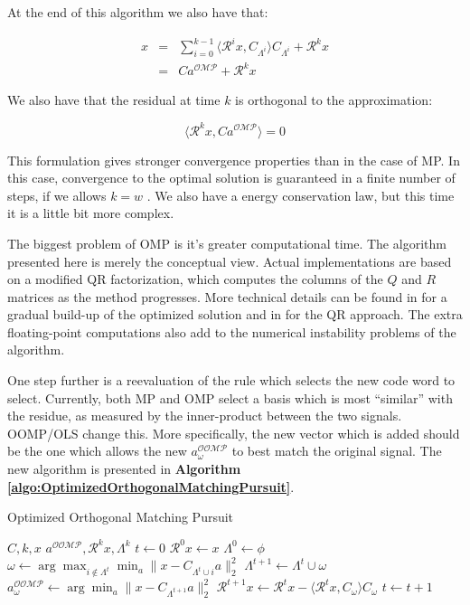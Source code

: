 \documentclass[runningheads,a4paper]{llncs}
\begin{document}
At the end of this algorithm we also have that:

\begin{eqnarray}
x & = & \sum_{i=0}^{k-1} \langle \mathcal{R}^ix , C_{\Lambda^i} \rangle C_{\Lambda^i} + \mathcal{R}^kx \\
\label{eqn:OrthogonalMatchingPursuitResult}
  & = & Ca^\mathcal{OMP} + \mathcal{R}^kx
\end{eqnarray}

We also have that the residual at time $k$ is orthogonal to the approximation:

\begin{equation*}
\langle \mathcal{R}^kx , Ca^\mathcal{OMP} \rangle = 0
\end{equation*}

This formulation gives stronger convergence properties than in the case of MP. In this case, convergence to the optimal solution is guaranteed in a finite number of steps, if we allows $k = w$ \cite{matchingpursuit2,pursuitdifferences}. We also have a energy conservation law, but this time it is a little bit more complex.

The biggest problem of OMP is it's greater computational time. The algorithm presented here is merely the conceptual view. Actual implementations are based on a modified QR factorization, which computes the columns of the $Q$ and $R$ matrices as the method progresses. More technical details can be found in \cite{matchingpursuit2} for a gradual build-up of the optimized solution and in \cite{pursuitdifferences} for the QR approach. The extra floating-point computations also add to the numerical instability problems of the algorithm.

One step further is a reevaluation of the rule which selects the new code word to select. Currently, both MP and OMP select a basis which is most ``similar'' with the residue, as measured by the inner-product between the two signals. OOMP/OLS change this. More specifically, the new vector which is added should be the one which allows the new $a_\omega^\mathcal{OOMP}$ to best match the original signal. The new algorithm is presented in \textbf{Algorithm \ref{algo:OptimizedOrthogonalMatchingPursuit}}.

\begin{algorithm}
\caption{Optimized Orthogonal Matching Pursuit}
\label{algo:OptimizedOrthogonalMatchingPursuit}
\begin{algorithmic}
\Require $C,k,x$
\Ensure $a^\mathcal{OOMP},\mathcal{R}^kx,\Lambda^k$
\State $t \gets 0$
\State $\mathcal{R}^0x \gets x$
\State $\Lambda^0 \gets \phi$
\State $\omega \gets \arg \max_{i \not\in \Lambda^t} \min_a \| x - C_{\Lambda^{t} \cup i}a \|_2^2$
\State $\Lambda^{t+1} \gets \Lambda^t \cup \omega$
\State $a_\omega^\mathcal{OOMP} \gets \arg \min_a \| x - C_{\Lambda^{t+1}}a \|_2^2$
\State $\mathcal{R}^{t+1}x \gets \mathcal{R}^tx - \langle \mathcal{R}^tx , C_\omega \rangle C_\omega$
\State $t \gets t + 1$
\EndWhile
\end{algorithmic}
\end{algorithm}
\end{document}

